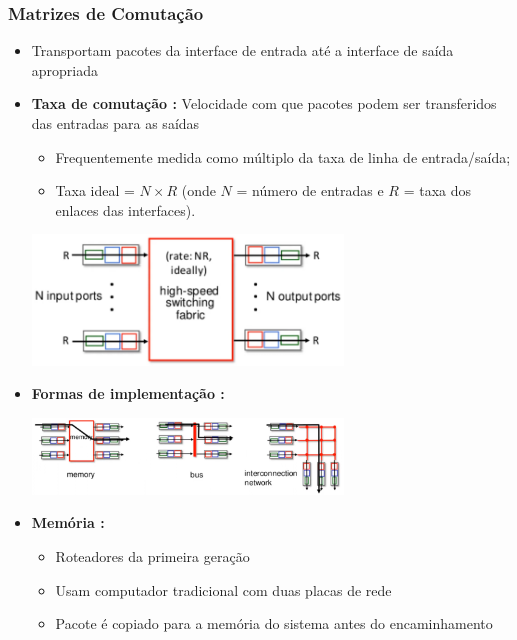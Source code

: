         \subsubsection*{Matrizes de Comutação} 

            \begin{itemize}[left=0.5cm, align=left, nosep]
                
                \item Transportam pacotes da interface de entrada até a interface de saída apropriada
                \item \textbf{Taxa de comutação :} Velocidade com que pacotes podem ser transferidos das entradas para as saídas
                    \begin{itemize}[left=0.5cm, nosep, label=$\hookrightarrow$]
                        \item Frequentemente medida como múltiplo da taxa de linha de entrada/saída; 
                        \item  Taxa ideal = $N \times R$ (onde $N$ = número de entradas e $R$ = taxa dos enlaces das interfaces). 
                    \end{itemize}
                    
                \begin{center}
                    \includegraphics[width=0.65\textwidth]{img/cap-04/taxa-de-comutacao.png}
                \end{center}

                \item \textbf{Formas de implementação :}
                \begin{center}
                    \includegraphics[width=0.65\textwidth]{img/cap-04/implementacao-matriz-de-comutacao.png}
                \end{center}

                \item \textbf{Memória :}  
                    \begin{itemize}[left=0.5cm, nosep, label=$\hookrightarrow$]
                        \item Roteadores da primeira geração 
                        \item Usam computador tradicional com duas placas de rede 
                        \item Pacote é copiado para a memória do sistema antes do encaminhamento 
                        

\end{itemize}
\end{itemize}
